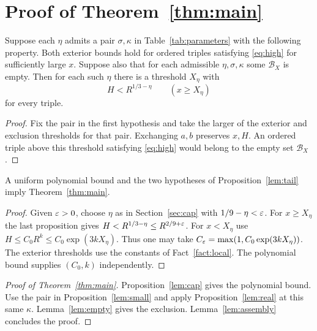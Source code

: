 \section{Proof of Theorem~\ref{thm:main}}\label{sec:end}
\begin{proposition}\label{lem:tail}
Suppose each $\eta$ admits a pair $\sigma,\kappa$ in
Table~\ref{tab:parameters} with the following property. Both exterior
bounds hold for ordered triples satisfying \eqref{eq:high} for sufficiently
large $x$. Suppose also that for each admissible $\eta,\sigma,\kappa$ some
$\mathcal B_X$ is empty. Then for each such $\eta$ there is a threshold
$X_\eta$ with
\[
                 H<R^{1/3-\eta}\qquad (x\ge X_\eta)
\]
for every triple.
\end{proposition}
\begin{proof}
Fix the pair in the first hypothesis and take the larger of the exterior
and exclusion thresholds for that pair. Exchanging $a,b$ preserves $x,H$.
An ordered triple above this threshold satisfying \eqref{eq:high} would
belong to the empty set $\mathcal B_X$.
\end{proof}
\begin{lemma}\label{lem:assembly}
A uniform polynomial bound and the two hypotheses of
Proposition~\ref{lem:tail} imply Theorem~\ref{thm:main}.
\end{lemma}
\begin{proof}
Given $\varepsilon>0$, choose $\eta$ as in Section~\ref{sec:cap} with
$1/9-\eta<\varepsilon$. For $x\ge X_\eta$ the last proposition gives
$H<R^{1/3-\eta}\le R^{2/9+\varepsilon}$. For $x<X_\eta$ use
$H\le C_0R^k\le C_0\exp(3kX_\eta)$. Thus one may take
$C_\varepsilon=\max(1,C_0\exp(3kX_\eta))$.
The exterior thresholds use the constants of Fact~\ref{fact:local}.
The polynomial bound supplies $(C_0,k)$ independently.
\end{proof}
\begin{proof}[Proof of Theorem~\ref{thm:main}]
Proposition~\ref{lem:cap} gives the polynomial bound. Use the pair
in Proposition~\ref{lem:small} and apply Proposition~\ref{lem:real}
at this same $\kappa$. Lemma~\ref{lem:empty} gives the exclusion.
Lemma~\ref{lem:assembly} concludes the proof.
\end{proof}
